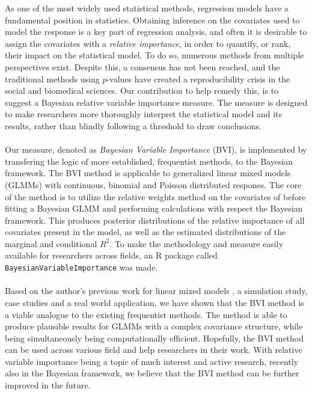 As one of the most widely used statistical methods, regression models have a fundamental position in statistics. Obtaining inference on the covariates used to model the response is a key part of regression analysis, and often it is desirable to assign the covariates with a \textit{relative importance}, in order to quantify, or rank, their impact on the statistical model. To do so, numerous methods from multiple perspectives exist. Despite this, a consensus has not been reached, and the traditional methods using $p$-values have created a reproducibility crisis in the social and biomedical sciences. Our contribution to help remedy this, is to suggest a Bayesian relative variable importance measure. The measure is designed to make researchers more thoroughly interpret the statistical model and its results, rather than blindly following a threshold to draw conclusions.
\\
\\
Our measure, denoted as \textit{Bayesian Variable Importance} (BVI), is implemented by transfering the logic of more established, frequentist methods, to the Bayesian framework. The BVI method is applicable to generalized linear mixed models (GLMMs) with continuous, binomial and Poisson distributed respones. The core of the method is to utilize the relative weights method on the covariates of before fitting a Bayesian GLMM and performing calculations with respect the Bayesian framework. This produces posterior distributions of the relative importance of all covariates present in the model, as well as the estimated distributions of the marginal and conditional $R^2$. To make the methodology and measure easily available for researchers across fields, an R package called \texttt{BayesianVariableImportance} was made.
\\
\\
Based on the author's previous work for linear mixed models \citep{Arnstad:Relative_variable_importance_in_Bayesian_linear_mixed_models:2024}, a simulation study, case studies and a real world application, we have shown that the BVI method is a viable analogue to the existing frequentist methods. The method is able to produce plausible results for GLMMs with a complex covariance structure, while being simultaneously being computationally efficient. Hopefully, the BVI method can be used across various field and help researchers in their work. With relative variable importance being a topic of much interest and active research, recently also in the Bayesian framework, we believe that the BVI method can be further improved in the future.